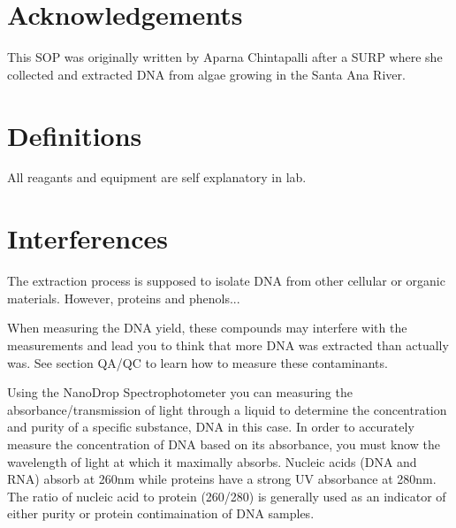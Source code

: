 \documentclass[12pt]{../SOP3_alpha}\usepackage[]{graphicx}\usepackage[]{color}
\begin{document}
\tableofcontents

\newpage

\section{Acknowledgements}

This SOP was originally written by Aparna Chintapalli after a SURP where she collected and extracted DNA from algae growing in the Santa Ana River.

\section{Definitions}

\NP All reagants and equipment are self explanatory in lab. 

\section{Interferences}

\NP The extraction process is supposed to isolate DNA from other cellular or organic materials. However, proteins and phenols...  

\NP When measuring the DNA yield, these compounds may interfere with the measurements and lead you to think that more DNA was extracted than actually was. See section QA/QC to learn how to measure these contaminants.

\NP Using the NanoDrop Spectrophotometer you can measuring the absorbance/transmission of light through a liquid to determine the concentration and purity of a specific substance, DNA in this case. In order to accurately measure the concentration of DNA based on its absorbance, you must know the wavelength of light at which it maximally absorbs. Nucleic acids (DNA and RNA) absorb at 260nm while proteins have a strong UV absorbance at 280nm. The ratio of nucleic acid to protein (260/280) is generally used as an indicator of either purity or protein contimaination of DNA samples.
\end{document}
